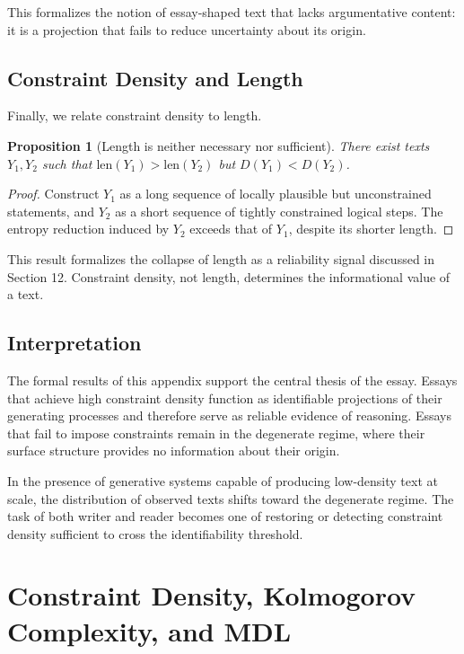 \documentclass[12pt, oneside]{article}
\theoremstyle{plain}
\newtheorem{proposition}[theorem]{Proposition}
\theoremstyle{definition}
\theoremstyle{remark}
\begin{document}
This formalizes the notion of essay-shaped text that lacks argumentative content:
it is a projection that fails to reduce uncertainty about its origin.

\subsection{Constraint Density and Length}

Finally, we relate constraint density to length.

\begin{proposition}[Length is neither necessary nor sufficient]
There exist texts $Y_1, Y_2$ such that $\text{len}(Y_1) > \text{len}(Y_2)$ but
$D(Y_1) < D(Y_2)$.
\end{proposition}

\begin{proof}
Construct $Y_1$ as a long sequence of locally plausible but unconstrained statements,
and $Y_2$ as a short sequence of tightly constrained logical steps. The entropy
reduction induced by $Y_2$ exceeds that of $Y_1$, despite its shorter length.
\end{proof}

This result formalizes the collapse of length as a reliability signal discussed in
Section 12. Constraint density, not length, determines the informational value of
a text.

\subsection{Interpretation}

The formal results of this appendix support the central thesis of the essay. Essays
that achieve high constraint density function as identifiable projections of their
generating processes and therefore serve as reliable evidence of reasoning. Essays
that fail to impose constraints remain in the degenerate regime, where their surface
structure provides no information about their origin.

In the presence of generative systems capable of producing low-density text at scale,
the distribution of observed texts shifts toward the degenerate regime. The task of
both writer and reader becomes one of restoring or detecting constraint density
sufficient to cross the identifiability threshold.

\section{Constraint Density, Kolmogorov Complexity, and MDL}
\end{document}
